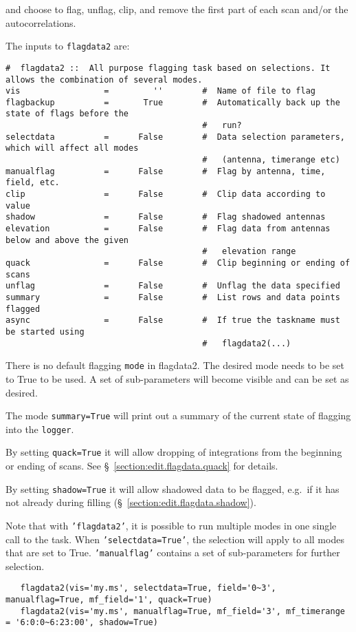 and choose to flag, unflag, clip, and
remove the first part of each scan and/or the 
autocorrelations.

The inputs to {\tt flagdata2} are:
\small
\begin{verbatim}
#  flagdata2 ::  All purpose flagging task based on selections. It allows the combination of several modes.
vis                 =         ''        #  Name of file to flag
flagbackup          =       True        #  Automatically back up the state of flags before the
                                        #   run?
selectdata          =      False        #  Data selection parameters, which will affect all modes
                                        #   (antenna, timerange etc)
manualflag          =      False        #  Flag by antenna, time, field, etc.
clip                =      False        #  Clip data according to value
shadow              =      False        #  Flag shadowed antennas
elevation           =      False        #  Flag data from antennas below and above the given
                                        #   elevation range
quack               =      False        #  Clip beginning or ending of scans
unflag              =      False        #  Unflag the data specified
summary             =      False        #  List rows and data points flagged
async               =      False        #  If true the taskname must be started using
                                        #   flagdata2(...)
\end{verbatim}
\normalsize

There is no default flagging {\tt mode} in flagdata2.  The desired mode needs to be set to True to be used. A set of sub-parameters will
become visible and can be set as desired.

The mode {\tt summary=True} will print out a summary of the current
state of flagging into the {\tt logger}.

By setting {\tt quack=True} it will allow dropping of integrations from the
beginning or ending of scans.  See \S~\ref{section:edit.flagdata.quack} for
details.

By setting {\tt shadow=True} it will allow shadowed data to be flagged,
e.g.\ if it has not already during filling 
(\S~\ref{section:edit.flagdata.shadow}).

Note that with {\tt 'flagdata2'}, it is possible to run multiple modes in one single call to the task. When {\tt 'selectdata=True'}, the
selection will apply to all modes that are set to True. {\tt 'manualflag'} contains a set of sub-parameters for further selection.
\small
\begin{verbatim}
   flagdata2(vis='my.ms', selectdata=True, field='0~3', manualflag=True, mf_field='1', quack=True)
   flagdata2(vis='my.ms', manualflag=True, mf_field='3', mf_timerange = '6:0:0~6:23:00', shadow=True)
\end{verbatim}
\normalsize



